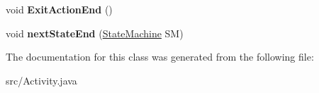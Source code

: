 \begin{DoxyCompactItemize}
\item 
\hypertarget{class_activity_ae1eab2fa03abfe99dc03050f63c3b584}{void {\bfseries Exit\-Action\-End} ()}\label{class_activity_ae1eab2fa03abfe99dc03050f63c3b584}

\item 
\hypertarget{class_activity_ad7a208274460ca5febd5cd5c2ecd0151}{void {\bfseries next\-State\-End} (\hyperlink{class_state_machine}{State\-Machine} S\-M)}\label{class_activity_ad7a208274460ca5febd5cd5c2ecd0151}

\end{DoxyCompactItemize}


The documentation for this class was generated from the following file\-:\begin{DoxyCompactItemize}
\item 
src/Activity.\-java\end{DoxyCompactItemize}
